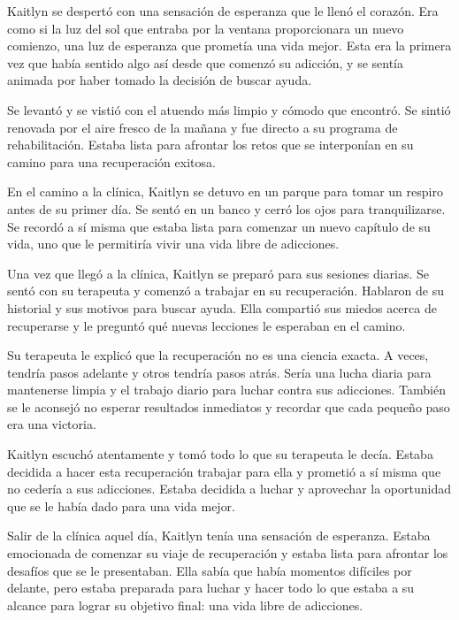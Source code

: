 

Kaitlyn se despertó con una sensación de esperanza que le llenó el corazón. Era como si la luz del sol que entraba por la ventana proporcionara un nuevo comienzo, una luz de esperanza que prometía una vida mejor. Esta era la primera vez que había sentido algo así desde que comenzó su adicción, y se sentía animada por haber tomado la decisión de buscar ayuda.

Se levantó y se vistió con el atuendo más limpio y cómodo que encontró. Se sintió renovada por el aire fresco de la mañana y fue directo a su programa de rehabilitación. Estaba lista para afrontar los retos que se interponían en su camino para una recuperación exitosa.

En el camino a la clínica, Kaitlyn se detuvo en un parque para tomar un respiro antes de su primer día. Se sentó en un banco y cerró los ojos para tranquilizarse. Se recordó a sí misma que estaba lista para comenzar un nuevo capítulo de su vida, uno que le permitiría vivir una vida libre de adicciones.

Una vez que llegó a la clínica, Kaitlyn se preparó para sus sesiones diarias. Se sentó con su terapeuta y comenzó a trabajar en su recuperación. Hablaron de su historial y sus motivos para buscar ayuda. Ella compartió sus miedos acerca de recuperarse y le preguntó qué nuevas lecciones le esperaban en el camino.

Su terapeuta le explicó que la recuperación no es una ciencia exacta. A veces, tendría pasos adelante y otros tendría pasos atrás. Sería una lucha diaria para mantenerse limpia y el trabajo diario para luchar contra sus adicciones. También se le aconsejó no esperar resultados inmediatos y recordar que cada pequeño paso era una victoria.

Kaitlyn escuchó atentamente y tomó todo lo que su terapeuta le decía. Estaba decidida a hacer esta recuperación trabajar para ella y prometió a sí misma que no cedería a sus adicciones. Estaba decidida a luchar y aprovechar la oportunidad que se le había dado para una vida mejor.

Salir de la clínica aquel día, Kaitlyn tenía una sensación de esperanza. Estaba emocionada de comenzar su viaje de recuperación y estaba lista para afrontar los desafíos que se le presentaban. Ella sabía que había momentos difíciles por delante, pero estaba preparada para luchar y hacer todo lo que estaba a su alcance para lograr su objetivo final: una vida libre de adicciones.